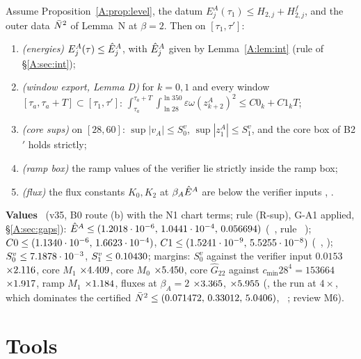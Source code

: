 \documentclass[11pt]{article}
\begin{document}
\begin{theorem}\label{A:thm:A}
Assume Proposition~\ref{A:prop:level}, the datum $E^A_j(\tau_1)\le H_{2,j}+H^f_{2,j}$, and the outer data $\bar N^2$ of Lemma~N at $\beta=2$. Then on $[\tau_1,\tau']$:
\begin{enumerate}[label=(\alph*),leftmargin=2em]
\item \emph{(energies)} $E^A_j(\tau)\le\hat E^A_j$, with $\hat E^A_j$ given by Lemma~\ref{A:lem:int} (rule of \S\ref{A:sec:int});
\item \emph{(window export, Lemma D)} for $k=0,1$ and every window $[\tau_a,\tau_a+T]\subset[\tau_1,\tau']$: $\int_{\tau_a}^{\tau_a+T}\!\int_{\ln28}^{\ln350}\varepsilon\omega(z^A_{k+2})^2\le C0_k+C1_kT$;
\item \emph{(core sups)} on $[28,60]$: $\sup|v_A|\le S^v_0$, $\sup|z^A_1|\le S^v_1$, and the core box of B2$'$ holds strictly;
\item \emph{(ramp box)} the ramp values of the verifier lie strictly inside the ramp box;
\item \emph{(flux)} the flux constants $K_0,K_2$ at $\beta_A\hat E^A$ are below the verifier inputs , .
\end{enumerate}
\textbf{Values} \tC\ (v35, B0 route (b) with the N1 chart terms; rule (R-sup), G-A1 applied, \S\ref{A:sec:gaps}): $\hat E^A\le(1.2018\cdot10^{-6},\,1.0441\cdot10^{-4},\,0.056694)$ (\SU\ , rule \SA\ ); $C0\le(1.1340\cdot10^{-6},\,1.6623\cdot10^{-4})$, $C1\le(1.5241\cdot10^{-9},\,5.5255\cdot10^{-8})$ (\SU\ , ); $S^v_0\le7.1878\cdot10^{-3}$, $S^v_1\le0.10430$; margins: $S^v_0$ against the verifier input $0.0153$ $\times2.116$, core $M_1$ $\times4.409$, core $M_0$ $\times5.450$, core $\hat G_{22}$ against $c_{\min}28^4=153664$ $\times1.917$, ramp $M_1$ $\times1.184$, fluxes at $\beta_A=2$ $\times3.365$, $\times5.955$ (, the run at $4\times$, which dominates the certified $\bar N^2\le(0.071472,\,0.33012,\,5.0406)$, \SU\ ; review M6).
\end{theorem}

\section{Tools}\label{A:sec:tools}
\end{document}
